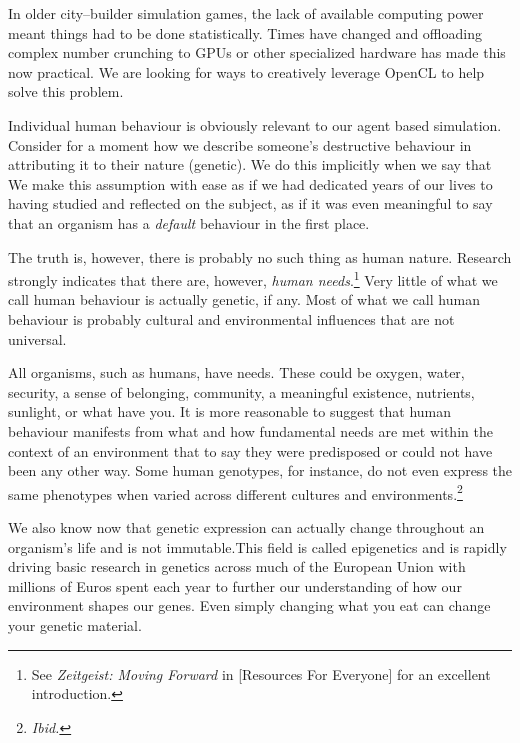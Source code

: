 In older city--builder simulation games, the lack of available computing power meant things had to be done statistically. Times have changed and offloading complex number crunching to GPUs or other specialized hardware has made this now practical. We are looking for ways to creatively leverage OpenCL to help solve this problem.


Individual human behaviour is obviously relevant to our agent based simulation. Consider for a moment how we describe someone's destructive behaviour in attributing it to their nature (genetic). We do this implicitly when we say that  We make this assumption with ease as if we had dedicated years of our lives to having studied and reflected on the subject, as if it was even meaningful to say that an organism has a {\it default} behaviour in the first place.

The truth is, however, there is probably no such thing as human nature. Research strongly indicates that there are, however, {\it human needs}.\footnote{See {\it Zeitgeist: Moving Forward} in [Resources For Everyone] for an excellent introduction.} Very little of what we call human behaviour is actually genetic, if any. Most of what we call human behaviour is probably cultural and environmental influences that are not universal.\footnotecite[henrich2010] 

All organisms, such as humans, have needs. These could be oxygen, water, security, a sense of belonging, community, a meaningful existence, nutrients, sunlight, or what have you. It is more reasonable to suggest that human behaviour manifests from what and how fundamental needs are met within the context of an environment that to say they were predisposed or could not have been any other way. Some human genotypes, for instance, do not even express the same phenotypes when varied across different cultures and environments.\footnote{\it Ibid.}

We also know now that genetic expression can actually change throughout an organism's life and is not immutable. This field is called epigenetics and is rapidly driving basic research in genetics across much of the European Union with millions of Euros spent each year to further our understanding of how our environment shapes our genes. Even simply changing what you eat can change your genetic material.


